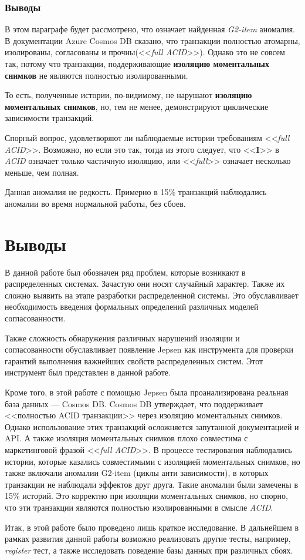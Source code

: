 \documentclass[14pt,  openany]{book}
\begin{document}
\subsection{Выводы}
В этом параграфе будет рассмотрено, что означает найденная \textit{G2-item} аномалия. В документации Azure Cosmos DB сказано, что транзакции полностью атомарны, изолированы, согласованы и прочны(<<\textit{full ACID}>>).  Однако это не совсем так, потому что транзакции, поддерживающие \textbf{изоляцию моментальных снимков} не являются полностью изолированными. 
\par
То есть, полученные  истории, по-видимому, не нарушают \textbf{изоляцию моментальных снимков}, но, тем не менее, демонстрируют циклические зависимости транзакций.
\par
Спорный вопрос, удовлетворяют ли наблюдаемые истории требованиям <<\textit{full ACID}>>. Возможно, но если это так, тогда из этого следует, что <<\textbf{I}>> в \textit{ACID} означает только частичную изоляцию, или <<\textit{full}>> означает несколько меньше, чем полная.
\par
Данная аномалия не редкость. Примерно в 15\% транзакций наблюдались аномалии во время нормальной работы, без сбоев.


\chapter{Выводы}
В данной работе был обозначен ряд проблем, которые возникают в распределенных системах. Зачастую они носят случайный характер. Также их сложно выявить на этапе разработки распределенной системы.  Это обуславливает необходимость введения формальных определений различных моделей согласованности.
\par Также сложность обнаружения различных нарушений изоляции и согласованности обуславливает появление Jepsen как инструмента для проверки гарантий выполнения важнейших свойств распределенных систем. Этот инструмент был представлен в данной работе.
\par Кроме того, в этой работе с помощью Jepsen была проанализирована реальная база данных --- Cosmos DB.  Cosmos DB утверждает, что поддерживает  <<полностью ACID транзакции>> через изоляцию моментальных снимков. Однако использование этих транзакций осложняется запутанной документацией и API.  А также изоляция моментальных снимков плохо совместима с маркетинговой фразой <<\textit{full ACID}>>.  В процессе тестирования наблюдались истории, которые казались совместимыми с изоляцией моментальных снимков, но также включали аномалии G2-item (циклы анти зависимости), в которых транзакции не наблюдали эффектов друг друга.  Такие аномалии были замечены в 15\% историй. Это корректно при изоляции моментальных снимков, но спорно, что эти транзакции являются полностью изолированными  в смысле \textit{ACID}.
\par Итак, в этой работе было проведено лишь краткое исследование. В дальнейшем в рамках развития данной работы возможно реализовать другие тесты, например, \textit{register} тест, а также исследовать поведение базы данных при различных сбоях.




\end{document}
